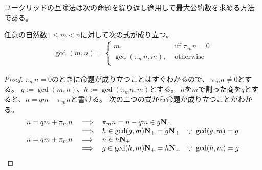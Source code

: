 	ユークリッドの互除法は次の命題を繰り返し適用して最大公約数を求める方法
	である。

	\begin{proposition}[ユークリッドの互除法]
	\label{prop:ユークリッドの互除法} %
		任意の自然数$1\le m<n$に対して次の式が成り立つ。
		\begin{equation*}\begin{split}
			\gcd(m,n) = \begin{cases}
				m, &\text{ iff } \pi_mn = 0 \\
				\gcd(\pi_mn,m), &\text{ otherwise } \\
			\end{cases}
		\end{split}\end{equation*}
	\end{proposition} %
	\begin{proof} $\pi_mn=0$のときに命題が成り立つことはすぐわかるので、
	$\pi_mn\neq0$とする。
	$g:=\gcd(m,n)$、$h:=\gcd(\pi_mn,m)$とする。
	$n$を$m$で割った商を$q$とすると、$n=qm+\pi_mn$と書ける。
	次の二つの式から命題が成り立つことがわかる。
	{\setlength\arraycolsep{2pt}
	\begin{equation*}\begin{array}{rcll}
		n=qm+\pi_mn &\implies& \pi_mn = n-qm\in g\mathbf{N}_+ \\
		&\implies& h\in \gcd(g,m)\mathbf{N}_+ = g\mathbf{N}_+
			& \because\; \gcd(g,m) = g \\
		n=qm+\pi_mn &\implies& n\in h\mathbf{N}_+ \\
		&\implies& g\in \gcd(h,m)\mathbf{N}_+ = h\mathbf{N}_+
			& \because\; \gcd(h,m)=g \\
	\end{array}\end{equation*}
	}
	\end{proof}


